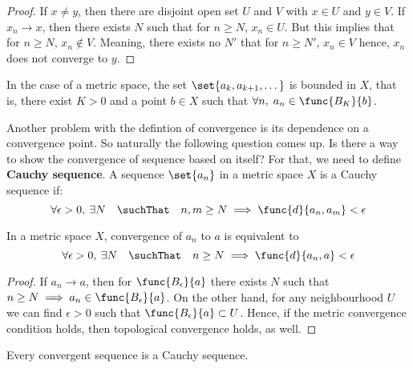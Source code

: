 \begin{proof}
    If \(x \neq y\), then there are disjoint open set \(U\) and \(V\) with \(x \in U\) and \(y \in V\). If \(x_n \to x\), then there exists \(N\) such that for \(n \geq N\), \(x_n \in U\). But this implies that for \(n \geq N\), \(x_n \notin V\). Meaning, there exists no \(N'\) that for \(n \geq N'\), \(x_n \in V\) hence, \(x_n\) does not converge to \(y\).
\end{proof}

In the case of a metric space, the set \(\set{ a_k, a_{k + 1} , \dots }\) is bounded in \(X\), that is, there exist \(K > 0\) and a point \(b \in X\) such that \(\forall n,\; a_n \in \func{B_K}{b}\).

Another problem with the defintion of convergence is its dependence on a convergence point. So naturally the following question comes up. Is there a way to show the convergence of sequence based on itself?
For that, we need to define \textbf{Cauchy sequence}. A sequence \(\set{a_n}\) in a metric space \(X\) is a Cauchy sequence if:
\begin{equation*}
     \forall \epsilon > 0,\: \exists N \quad \suchThat \quad n, m \geq N \implies \func{d}{a_n,a_m} < \epsilon  
\end{equation*}

\begin{lemma}
    In a metric space \(X\), convergence of \(a_n\) to \(a\) is equivalent to
    \begin{equation*}
        \forall \epsilon > 0,\: \exists N \quad \suchThat \quad n \geq N \implies \func{d}{a_n , a} < \epsilon
    \end{equation*}
\end{lemma}
\begin{proof}
    If \(a_n \to a\), then for \(\func{B_{\epsilon}}{a}\) there exists \(N\) such that \(n \geq N \implies a_n \in \func{B_{\epsilon}}{a}\). On the other hand, for any neighbourhood \(U\) we can find \(\epsilon > 0\) such that \(\func{B_{\epsilon}}{a} \subset U\). Hence, if the metric convergence condition holds, then topological convergence holds, as well.
\end{proof}

\begin{theorem} \label{ConvergenceCauchy}
    Every convergent sequence is a Cauchy sequence.
\end{theorem}


